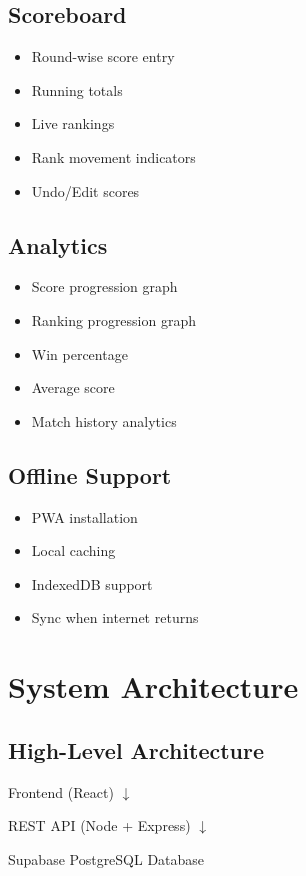 \documentclass[11pt,a4paper]{article}
\begin{document}
\subsection{Scoreboard}
\begin{itemize}
    \item Round-wise score entry
    \item Running totals
    \item Live rankings
    \item Rank movement indicators
    \item Undo/Edit scores
\end{itemize}

\subsection{Analytics}
\begin{itemize}
    \item Score progression graph
    \item Ranking progression graph
    \item Win percentage
    \item Average score
    \item Match history analytics
\end{itemize}

\subsection{Offline Support}
\begin{itemize}
    \item PWA installation
    \item Local caching
    \item IndexedDB support
    \item Sync when internet returns
\end{itemize}

\section{System Architecture}

\subsection{High-Level Architecture}

\begin{center}
Frontend (React)
$\downarrow$

REST API (Node + Express)
$\downarrow$

Supabase PostgreSQL Database
\end{center}
\end{document}
